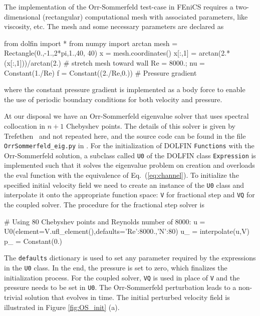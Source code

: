The implementation of the Orr-Sommerfeld test-case in FEniCS requires a two-dimensional (rectangular) computational mesh with associated parameters, like viscosity, etc. The  mesh and some necessary parameters are declared as
\begin{python}
    from dolfin import *
    from numpy import arctan
    mesh = Rectangle(0.,-1.,2*pi,1.,40, 40)
    x = mesh.coordinates()
    x[:,1] = arctan(2.*(x[:,1]))/arctan(2.)  # stretch mesh toward wall
    Re = 8000.; nu = Constant(1./Re)
    f = Constant((2./Re,0.)) # Pressure gradient
\end{python}
where the constant pressure gradient is implemented as a body force to enable the use of periodic boundary conditions for both velocity and pressure.

At our disposal we have an Orr-Sommerfeld eigenvalue solver that uses spectral collocation in $n+1$ Chebyshev points. The details of this solver is given by Trefethen~\cite{Trefethen2006} and not repeated here, and the source code can be found in the file {\fontsize{12pt}{12pt}\verb!OrrSommerfeld_eig.py!} in \cite{MortensenMardal2010}. For the initialization of DOLFIN {\fontsize{12pt}{12pt}\texttt{Functions}} with the Orr-Sommerfeld solution, a subclass called {\fontsize{12pt}{12pt}\texttt{U0}} of the DOLFIN class {\fontsize{12pt}{12pt}\texttt{Expression}} is implemented such that it solves the eigenvalue problem on creation and overloads the eval function with the equivalence of Eq.~(\ref{eq:channel}). To initialize the specified initial velocity field we need to create an instance of the {\fontsize{12pt}{12pt}\texttt{U0}} class and interpolate it onto the appropriate function space: {\fontsize{12pt}{12pt}\texttt{V}} for fractional step and {\fontsize{12pt}{12pt}\texttt{VQ}} for the coupled solver. The procedure for the fractional step solver is
\begin{python}
    # Using 80 Chebyshev points and Reynolds number of 8000:
    u = U0(element=V.ufl_element(),defaults={'Re':8000.,'N':80})
    u_ = interpolate(u,V)
    p_ = Constant(0.)
\end{python}
The {\fontsize{12pt}{12pt}\texttt{defaults}} dictionary is used to set any parameter required by the
expressions in the {\fontsize{12pt}{12pt}\texttt{U0}} class. In the end, the pressure is set to zero, which finalizes the initialization process. For the coupled solver, {\fontsize{12pt}{12pt}\texttt{VQ}} is used in place of {\fontsize{12pt}{12pt}\texttt{V}} and the pressure needs to be set in {\fontsize{12pt}{12pt}\texttt{U0}}. The Orr-Sommerfeld perturbation leads to a non-trivial solution that evolves in time. The initial perturbed velocity field is illustrated in Figure \ref{fig:OS_init} (a).
